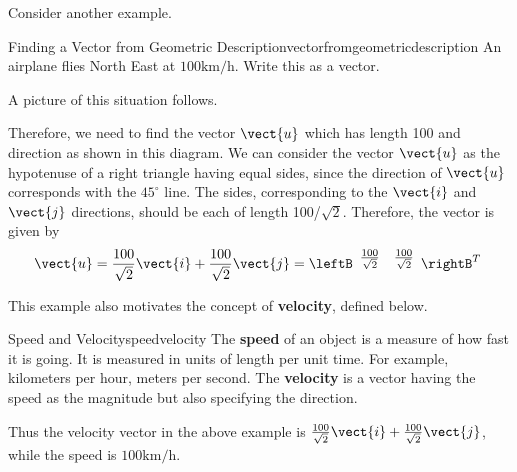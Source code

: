 Consider another example.

\begin{example}{Finding a Vector from Geometric Description}{vectorfromgeometricdescription}
An airplane flies North East at $100\textrm{km}/\textrm{h}$. Write this as a vector.
\end{example}

\begin{solution}
A picture of this situation follows.

\begin{center}
\end{center}

Therefore, we need to find the vector $\vect{u}$ which has length 100 and direction as shown in this diagram. 
We can consider the vector $\vect{u}$ as the hypotenuse of a
right triangle having equal sides, since the direction of $\vect{u}$ corresponds with the $45 ^{\circ}$ line. 
The sides, corresponding to the $\vect{i}$ and $\vect{j}$ directions,  should be each of length 100/$
\sqrt{2}.$ Therefore, the vector is given by 
\[
 \vect{u} = \frac{100}{\sqrt{2}} \vect{i}+ \frac{100}{\sqrt{2
}}\vect{j}
=
\leftB
\begin{array}{rr}
\vspace{0.05in} \frac{100}{\sqrt{2}} & \vspace{0.05in}\frac{100}{\sqrt{2}}
\end{array}
\rightB^T\
\]
\end{solution}

This example also motivates the concept of \textbf{velocity}, defined below.

\begin{definition}{Speed and Velocity}{speedvelocity}
The \textbf{speed}
 of an object is a measure of how fast it is going. It is
measured in units of length per unit time. For example, kilometers per
hour, meters per second. The
\textbf{velocity} is a vector having the speed as the
magnitude but also specifying the direction.
\end{definition}

Thus the velocity vector in the above example is $\vspace{0.05in}\frac{100}{\sqrt{2}}\vect{i}+
\vspace{0.05in}\frac{100}{\sqrt{2}}\vect{j}$, while the speed is $100\textrm{km}/\textrm{h}$.

